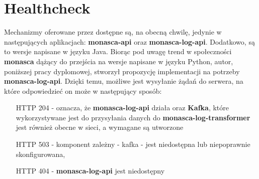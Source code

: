 
\section{Healthcheck}
\label{chapter:application_own:plans:healthcheck}

Mechanizmy oferowane przez  dostępne są, na obecną chwilę, jedynie
w następujących aplikacjach: \textbf{monasca-api} oraz \textbf{monasca-log-api}. Dodatkowo, są to wersje napisane w języku
Java. Biorąc pod uwagę trend w społeczności \textbf{monasca} dążący do przejścia na wersje napisane w języku Python,
autor, poniższej pracy dyplomowej, stworzył propozycję implementacji na potrzeby \textbf{monasca-log-api}. Dzięki
temu, możliwe jest wysyłanie żądań do serwera, na które odpowiedzieć on może w następujący sposób:
\begin{itemize}
    \item[HTTP 204] - oznacza, że \textbf{monasca-log-api} działa oraz \textbf{Kafka}, które wykorzystywane jest
    do przysyłania danych do \textbf{monasca-log-transformer} jest również obecne w sieci, a wymagane  są
    utworzone
    \item[HTTP 503] - komponent zależny - kafka - jest niedostępna lub niepoprawnie skonfigurowana,
    \item[HTTP 404] - \textbf{monasca-log-api} jest niedostępny
\end{itemize}

